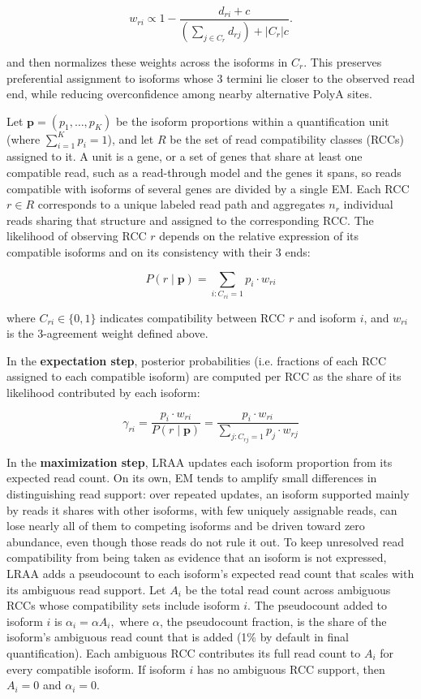 \[w_{ri} \propto 1 - \frac{d_{ri} + c}{\left(\sum_{j \in C_r} d_{rj}\right) + |C_r|c}.\]

and then normalizes these weights across the isoforms in \(C_r\). This preserves preferential assignment to isoforms whose 3\p{} termini lie closer to the observed read end, while reducing overconfidence among nearby alternative PolyA sites.

Let \(\mathbf{p} = (p_1, \ldots, p_K)\) be the isoform proportions within a quantification unit (where \(\sum_{i=1}^K p_i = 1\)), and let \(R\) be the set of read compatibility classes (RCCs) assigned to it. A unit is a gene, or a set of genes that share at least one compatible read, such as a read-through model and the genes it spans, so reads compatible with isoforms of several genes are divided by a single EM. Each RCC \(r \in R\) corresponds to a unique labeled read path and aggregates \(n_r\) individual reads sharing that structure and assigned to the corresponding RCC. The likelihood of observing RCC \(r\) depends on the relative expression of its compatible isoforms and on its consistency with their 3\p{} ends:

\[P(r \mid \mathbf{p}) = \sum_{i: C_{ri}=1} p_i \cdot w_{ri}\]

where \(C_{ri} \in \{0,1\}\) indicates compatibility between RCC \(r\) and isoform \(i\), and \(w_{ri}\) is the 3\p{}-agreement weight defined above.

In the \textbf{expectation step}, posterior probabilities (i.e. fractions of each RCC assigned to each compatible isoform) are computed per RCC as the share of its likelihood contributed by each isoform:

\[\gamma_{ri} = \frac{p_i \cdot w_{ri}}{P(r \mid \mathbf{p})} = \frac{p_i \cdot w_{ri}}{\sum_{j: C_{rj}=1} p_j \cdot w_{rj}}\]

In the \textbf{maximization step}, LRAA updates each isoform proportion from its expected read count. On its own, EM tends to amplify small differences in distinguishing read support: over repeated updates, an isoform supported mainly by reads it shares with other isoforms, with few uniquely assignable reads, can lose nearly all of them to competing isoforms and be driven toward zero abundance, even though those reads do not rule it out. To keep unresolved read compatibility from being taken as evidence that an isoform is not expressed, LRAA adds a pseudocount to each isoform's expected read count that scales with its ambiguous read support. Let \(A_i\) be the total read count across ambiguous RCCs whose compatibility sets include isoform \(i\). The pseudocount added to isoform \(i\) is \(\alpha_i = \alpha A_i,\) where \(\alpha\), the pseudocount fraction, is the share of the isoform's ambiguous read count that is added (1\% by default in final quantification). Each ambiguous RCC contributes its full read count to \(A_i\) for every compatible isoform. If isoform \(i\) has no ambiguous RCC support, then \(A_i = 0\) and \(\alpha_i = 0\).

